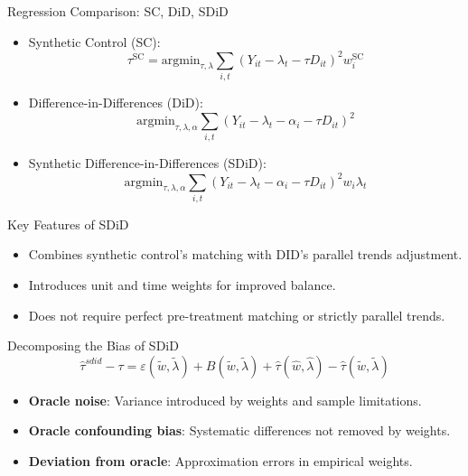\documentclass{beamer}
\begin{document}
\begin{frame}{Regression Comparison: SC, DiD, SDiD}

\begin{itemize}
    \item Synthetic Control (SC):
    \[
    \tau^{\text{SC}} = \textrm{argmin}_{\tau, \lambda} \sum_{i,t} (Y_{it} - \lambda_t - \tau D_{it})^2 w_i^{\text{SC}}
    \]
    \item Difference-in-Differences (DiD):
    \[
    \textrm{argmin}_{\tau, \lambda, \alpha} \sum_{i,t} (Y_{it} - \lambda_t - \alpha_i - \tau D_{it})^2
    \]
    \item Synthetic Difference-in-Differences (SDiD):
    \[
    \textrm{argmin}_{\tau, \lambda, \alpha} \sum_{i,t} (Y_{it} - \lambda_t - \alpha_i - \tau D_{it})^2 w_i \lambda_t
    \]
\end{itemize}

\end{frame}

\begin{frame}{Key Features of SDiD}

\begin{itemize}
    \item Combines synthetic control's matching with DID's parallel trends adjustment.
    \item Introduces unit and time weights for improved balance.
    \item Does not require perfect pre-treatment matching or strictly parallel trends.
\end{itemize}

\end{frame}




\begin{frame}{Decomposing the Bias of SDiD}
\[
\widehat{\tau}^{sdid} - \tau = \varepsilon(\widetilde{w}, \widetilde{\lambda}) + B(\widetilde{w}, \widetilde{\lambda}) + \widehat{\tau}(\widehat{w},\widehat{\lambda}) - \widehat{\tau}(\widetilde{w},\widetilde{\lambda})
\]
\begin{itemize}
\item \textbf{Oracle noise}: Variance introduced by weights and sample limitations.
\item \textbf{Oracle confounding bias}: Systematic differences not removed by weights.
\item \textbf{Deviation from oracle}: Approximation errors in empirical weights.
\end{itemize}
\end{frame}
\end{document}
